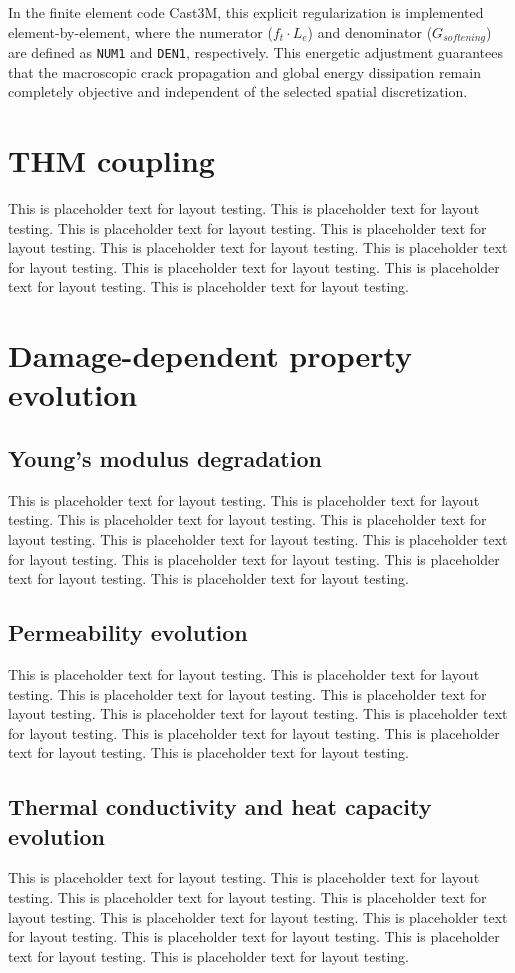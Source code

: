 \documentclass[a4paper,12pt,twoside]{report}     %
\begin{document}
In the finite element code Cast3M, this explicit regularization is implemented element-by-element, where the numerator ($f_t \cdot L_e$) and denominator ($G_{softening}$) are defined as \texttt{NUM1} and \texttt{DEN1}, respectively. This energetic adjustment guarantees that the macroscopic crack propagation and global energy dissipation remain completely objective and independent of the selected spatial discretization.



\section{THM coupling}
This is placeholder text for layout testing. This is placeholder text for layout testing. This is placeholder text for layout testing. This is placeholder text for layout testing. This is placeholder text for layout testing. This is placeholder text for layout testing. This is placeholder text for layout testing. This is placeholder text for layout testing. This is placeholder text for layout testing.

\section{Damage-dependent property evolution}
\subsection{Young's modulus degradation}
This is placeholder text for layout testing. This is placeholder text for layout testing. This is placeholder text for layout testing. This is placeholder text for layout testing. This is placeholder text for layout testing. This is placeholder text for layout testing. This is placeholder text for layout testing. This is placeholder text for layout testing. This is placeholder text for layout testing.
\subsection{Permeability evolution}
This is placeholder text for layout testing. This is placeholder text for layout testing. This is placeholder text for layout testing. This is placeholder text for layout testing. This is placeholder text for layout testing. This is placeholder text for layout testing. This is placeholder text for layout testing. This is placeholder text for layout testing. This is placeholder text for layout testing.
\subsection{Thermal conductivity and heat capacity evolution}
This is placeholder text for layout testing. This is placeholder text for layout testing. This is placeholder text for layout testing. This is placeholder text for layout testing. This is placeholder text for layout testing. This is placeholder text for layout testing. This is placeholder text for layout testing. This is placeholder text for layout testing. This is placeholder text for layout testing.
\end{document}
